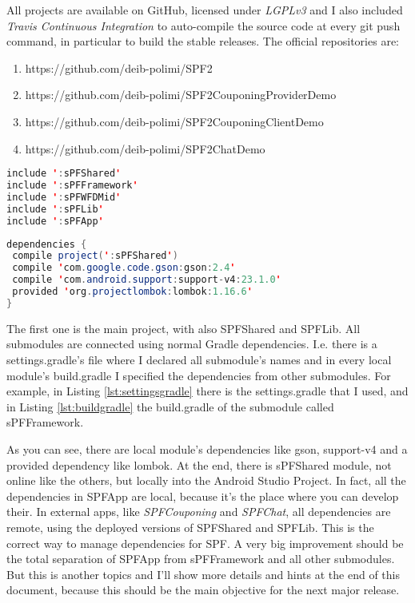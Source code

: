 All projects are available on GitHub, licensed under \emph{LGPLv3} and I also included \emph{Travis Continuous Integration} to auto-compile the source code at every \textsf{git push} command, in particular to build the stable releases.
The official repositories are:
\begin{enumerate}
	\item https://github.com/deib-polimi/SPF2
	\item https://github.com/deib-polimi/SPF2CouponingProviderDemo
	\item https://github.com/deib-polimi/SPF2CouponingClientDemo
	\item https://github.com/deib-polimi/SPF2ChatDemo
\end{enumerate}

\begin{lstlisting}[caption={settings.gradle},label=lst:settingsgradle, language=Java]
include ':sPFShared'
include ':sPFFramework'
include ':sPFWFDMid'
include ':sPFLib'
include ':sPFApp'
\end{lstlisting}

\begin{lstlisting}[caption={build.gradle},label=lst:buildgradle, language=Java]
dependencies {
 compile project(':sPFShared')
 compile 'com.google.code.gson:gson:2.4'
 compile 'com.android.support:support-v4:23.1.0'
 provided 'org.projectlombok:lombok:1.16.6'
}
\end{lstlisting}

The first one is the main project, with also \textsf{SPFShared} and \textsf{SPFLib}. All submodules are connected using normal Gradle dependencies.
I.e. there is a \textsf{settings.gradle}'s file where I declared all submodule's names and in every local module's \textsf{build.gradle} I specified the dependencies from other submodules. For example, in Listing \ref{lst:settingsgradle} there is the \textsf{settings.gradle} that I used, and in Listing \ref{lst:buildgradle} the \textsf{build.gradle} of the submodule called \textsf{sPFFramework}.

As you can see, there are local module's dependencies like \textsf{gson}, \textsf{support-v4} and a provided dependency like \textsf{lombok}. At the end, there is \textsf{sPFShared} module, not online like the others, but locally into the Android Studio Project. In fact, all the dependencies in \textsf{SPFApp} are local, because it's the place where you can develop their. In external apps, like \emph{SPFCouponing} and \emph{SPFChat}, all dependencies are remote, using the deployed versions of \textsf{SPFShared} and \textsf{SPFLib}. This is the correct way to manage dependencies for SPF.
A very big improvement should be the total separation of \textsf{SPFApp} from \textsf{sPFFramework} and all other submodules. But this is another topics and I'll show more details and hints at the end of this document, because this should be the main objective for the next major release.

